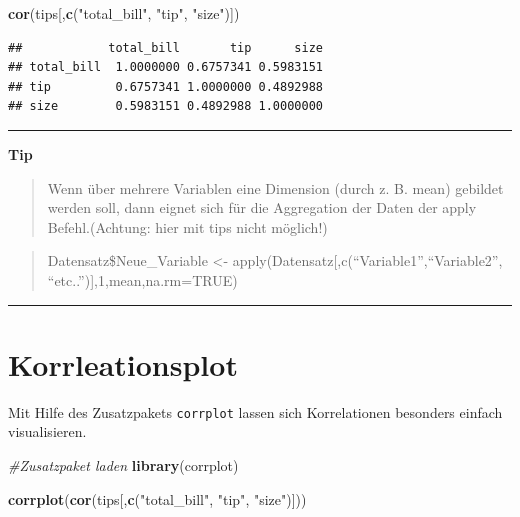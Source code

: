 \documentclass[10pt,ngerman,onside]{article}
\newenvironment{Shaded}{\begin{snugshade}}{\end{snugshade}}
\newcommand{\KeywordTok}[1]{\textcolor[rgb]{0.13,0.29,0.53}{\textbf{#1}}}
\newcommand{\StringTok}[1]{\textcolor[rgb]{0.31,0.60,0.02}{#1}}
\newcommand{\CommentTok}[1]{\textcolor[rgb]{0.56,0.35,0.01}{\textit{#1}}}
\newcommand{\NormalTok}[1]{#1}
\begin{document}
\begin{Shaded}
\begin{Highlighting}[]
\KeywordTok{cor}\NormalTok{(tips[,}\KeywordTok{c}\NormalTok{(}\StringTok{"total_bill"}\NormalTok{, }\StringTok{"tip"}\NormalTok{, }\StringTok{"size"}\NormalTok{)])}
\end{Highlighting}
\end{Shaded}

\begin{verbatim}
##            total_bill       tip      size
## total_bill  1.0000000 0.6757341 0.5983151
## tip         0.6757341 1.0000000 0.4892988
## size        0.5983151 0.4892988 1.0000000
\end{verbatim}

\begin{center}\rule{0.5\linewidth}{\linethickness}\end{center}

\textbf{Tip}

\begin{quote}
Wenn über mehrere Variablen eine Dimension (durch z. B. mean) gebildet
werden soll, dann eignet sich für die Aggregation der Daten der apply
Befehl.(Achtung: hier mit tips nicht möglich!)
\end{quote}

\begin{quote}
Datensatz\$Neue\_Variable \textless{}-
apply(Datensatz{[},c(``Variable1'',``Variable2'',
``etc..''){]},1,mean,na.rm=TRUE)
\end{quote}

\begin{center}\rule{0.5\linewidth}{\linethickness}\end{center}

\hypertarget{korrleationsplot}{%
\section{Korrleationsplot}\label{korrleationsplot}}

Mit Hilfe des Zusatzpakets \texttt{corrplot} lassen sich Korrelationen
besonders einfach visualisieren.

\begin{Shaded}
\begin{Highlighting}[]
\CommentTok{#Zusatzpaket laden}
\KeywordTok{library}\NormalTok{(corrplot)}

\KeywordTok{corrplot}\NormalTok{(}\KeywordTok{cor}\NormalTok{(tips[,}\KeywordTok{c}\NormalTok{(}\StringTok{"total_bill"}\NormalTok{, }\StringTok{"tip"}\NormalTok{, }\StringTok{"size"}\NormalTok{)]))}
\end{Highlighting}
\end{Shaded}
\end{document}
